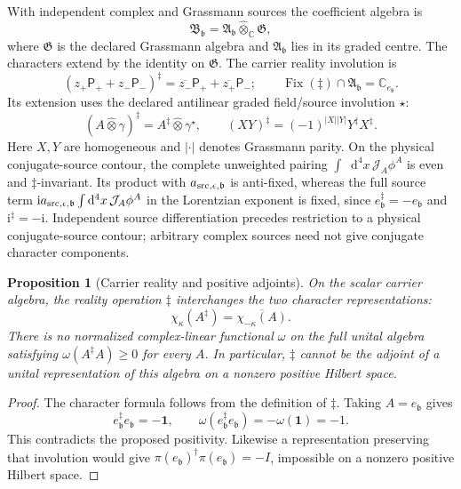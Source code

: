 \documentclass[final,5p,times,twocolumn,numbers,nopreprintline]{elsarticle}
\numberwithin{equation}{section}
\newtheorem{proposition}[theorem]{Proposition}
\theoremstyle{definition}
\theoremstyle{remark}
\newcommand{\dd}{\mathop{}\!\mathrm d}
\newcommand{\ii}{\mathrm i}
\newcommand{\bb}{\mathfrak b}
\newcommand{\CC}{\mathbb C}
\newcommand{\one}{\mathbf 1}
\newcommand{\ee}{e_{\bb}}
\begin{document}
With independent complex and Grassmann sources the coefficient algebra is
\begin{equation}
 \mathfrak B_{\bb}
   =\mathfrak A_{\bb}\widehat\otimes_{\CC}\mathfrak G,
 \label{eq:graded-carrier-source-algebra}
\end{equation}
where \(\mathfrak G\) is the declared Grassmann algebra and
\(\mathfrak A_{\bb}\) lies in its graded centre. The characters
extend by the identity on \(\mathfrak G\). The carrier reality
involution is
\[
 (z_+\mathsf P_++z_-\mathsf P_-)^{\ddagger}
    =\overline{z_-}\mathsf P_++\overline{z_+}\mathsf P_-;
 \qquad \operatorname{Fix}(\ddagger)\cap\mathfrak A_{\bb}
    =\CC_{\ee}.
\]
Its extension uses the declared antilinear graded field/source
involution \(\star\):
\[
 (A\widehat\otimes\gamma)^\ddagger
     =A^\ddagger\widehat\otimes\gamma^\star,
 \qquad
 (XY)^\ddagger=(-1)^{|X||Y|}Y^\ddagger X^\ddagger .
\]
Here \(X,Y\) are homogeneous and \(|\cdot|\) denotes Grassmann
parity. On the physical conjugate-source contour, the complete
unweighted pairing \(\int\dd^4x\,\mathcal J_A\phi^A\) is even
and \(\ddagger\)-invariant. Its product with
\(a_{{\rm src},\epsilon,\bb}\) is anti-fixed, whereas the full
source term \(\ii a_{{\rm src},\epsilon,\bb}
\int\dd^4x\,\mathcal J_A\phi^A\) in the Lorentzian exponent
is fixed, since \(\ee^\ddagger=-\ee\) and
\(\ii^\ddagger=-\ii\).
Independent source differentiation precedes restriction to a physical
conjugate-source contour; arbitrary complex sources need not give
conjugate character components.

\begin{proposition}[Carrier reality and positive adjoints]
\label{prop:carrier-reality-adjoint}
On the scalar carrier algebra, the reality operation \(\ddagger\)
interchanges the two character representations:
\begin{equation}
 \chi_\kappa(A^\ddagger)
       =\overline{\chi_{-\kappa}(A)}.
 \label{eq:reality-character-interchange}
\end{equation}
There is no normalized complex-linear functional \(\omega\) on the
full unital algebra satisfying
\(\omega(A^\ddagger A)\geq0\) for every \(A\).
In particular, \(\ddagger\) cannot be the adjoint of a unital
representation of this algebra on a nonzero positive Hilbert space.
\end{proposition}

\begin{proof}
The character formula follows from the definition of \(\ddagger\).
Taking \(A=\ee\) gives
\[
 \ee^\ddagger\ee=-\one,\qquad
 \omega(\ee^\ddagger\ee)=-\omega(\one)=-1.
\]
This contradicts the proposed positivity. Likewise a representation
preserving that involution would give
\(\pi(\ee)^\dagger\pi(\ee)=-I\), impossible on a nonzero
positive Hilbert space.
\end{proof}
\end{document}
